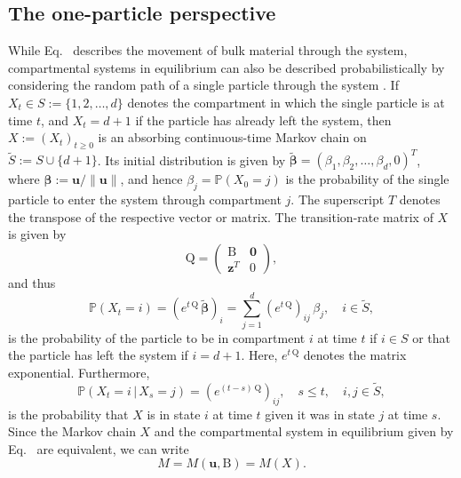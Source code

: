 \documentclass[smallextended]{svjour3}
\makeatletter
\renewcommand*{\eqref}[1]{%
  \hyperref[{#1}]{\textup{\tagform@{\ref*{#1}}}}%
}
\renewcommand{\tens}[1]{\mathrm{#1}}
\renewcommand{\vec}[1]{\mathbf{#1}}
\renewcommand{\P}{\mathbb{P}}
\newcommand{\suml}{\sum\limits}
\newcommand{\vnorms}[1]{\|#1\|}
\makeatother
\begin{document}
\subsection{The one-particle perspective}
\label{sec:the_one_particle_perspective}
While Eq.~\eqref{eqn:lin_CS_sys} describes the movement of bulk material through the system, compartmental systems in equilibrium can also be described probabilistically by considering the random path of a single particle through the system \citep{Metzler2018MGS}.
If $X_t\in S:=\{1,2,\ldots,d\}$ denotes the compartment in which the single particle is at time $t$, and $X_t=d+1$ if the particle has already left the system, then $X:=(X_t)_{t\geq0}$ is an absorbing continuous-time Markov chain \citep{Norris1997} on $\widetilde{S}:=S\cup\{d+1\}$.
Its initial distribution is given by $\widetilde{\vec{\beta}}=(\beta_1, \beta_2, \ldots, \beta_d, 0)^T$, where $\vec{\beta}:=\vec{u}/\vnorms{\vec{u}}$, and hence $\beta_j=\P(X_0=j)$ is the probability of the single particle to enter the system through compartment $j$.
The superscript $T$ denotes the transpose of the respective vector or matrix. 
The transition-rate matrix of $X$ is given by
\begin{equation}\label{eqn:Q}
  \tens{Q} =
  \begin{pmatrix}
    \tens{B} & \vec{0} \\
    \vec{z}^T & 0
  \end{pmatrix},
\end{equation}
and thus
\begin{equation}
  \P(X_t=i) = (e^{t\,\tens{Q}}\,\widetilde{\vec{\beta}})_i = \suml_{j=1}^d (e^{t\,\tens{Q}})_{ij}\,\beta_j, \quad i\in\widetilde{S},
\end{equation}
is the probability of the particle to be in compartment $i$ at time $t$ if $i\in S$ or that the particle has left the system if $i=d+1$.
Here, $e^{t\,\tens{Q}}$ denotes the matrix exponential.
Furthermore, 
\begin{equation}
  \P(X_t=i\,|\,X_s=j) = (e^{(t-s)\,\tens{Q}})_{ij},\quad s\leq t,\quad i,j\in\widetilde{S},
\end{equation}
is the probability that $X$ is in state $i$ at time $t$ given it was in state $j$ at time $s$.
Since the Markov chain $X$ and the compartmental system in equilibrium given by Eq.~\eqref{eqn:lin_CS_sys} are equivalent, we can write
\begin{equation}
  M=M(\vec{u},\tens{B}) = M(X).
\end{equation}
\end{document}
